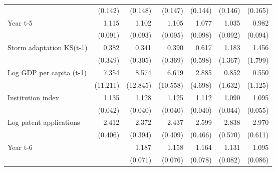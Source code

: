 \begin{table}[htbp]
\begin{tabular}{l*{6}{D{.}{.}{-1}}}
                    &     (0.142)         &     (0.148)         &     (0.147)         &     (0.144)         &     (0.146)         &     (0.165)         \\
\addlinespace
Year t-5            &       1.115         &       1.102         &       1.105         &       1.077         &       1.035         &       0.982         \\
                    &     (0.091)         &     (0.093)         &     (0.095)         &     (0.098)         &     (0.092)         &     (0.094)         \\
\addlinespace
Storm adaptation KS(t-1)&       0.382         &       0.341         &       0.390         &       0.617         &       1.183         &       1.456         \\
                    &     (0.349)         &     (0.305)         &     (0.369)         &     (0.598)         &     (1.367)         &     (1.799)         \\
\addlinespace
Log GDP per capita (t-1)&       7.354         &       8.574         &       6.619         &       2.885         &       0.852         &       0.550         \\
                    &    (11.211)         &    (12.845)         &    (10.558)         &     (4.698)         &     (1.632)         &     (1.125)         \\
\addlinespace
Institution index   &       1.135\sym{***}&       1.128\sym{***}&       1.125\sym{***}&       1.112\sym{***}&       1.090\sym{**} &       1.095\sym{*}  \\
                    &     (0.042)         &     (0.040)         &     (0.040)         &     (0.040)         &     (0.044)         &     (0.055)         \\
\addlinespace
Log patent applications&       2.412\sym{***}&       2.372\sym{***}&       2.437\sym{***}&       2.599\sym{***}&       2.838\sym{***}&       2.970\sym{***}\\
                    &     (0.406)         &     (0.394)         &     (0.409)         &     (0.466)         &     (0.570)         &     (0.611)         \\
\addlinespace
Year t-6            &                     &       1.187\sym{***}&       1.158\sym{**} &       1.164\sym{**} &       1.131\sym{*}  &       1.095         \\
                    &                     &     (0.071)         &     (0.076)         &     (0.078)         &     (0.082)         &     (0.086)         \\

\end{tabular}
\end{table}
